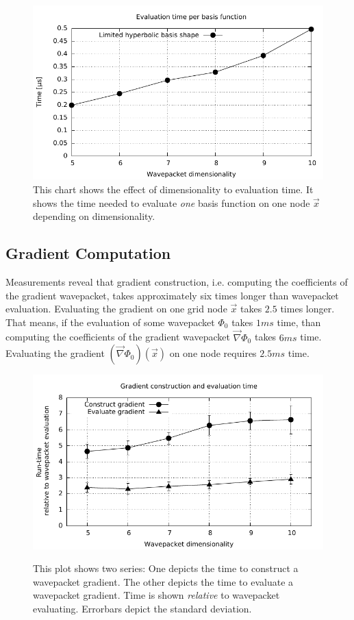\documentclass{article}
\begin{document}
\begin{figure}[H]
  \centering
  \includegraphics[width=1.0\textwidth]{plots/hawp_eval_efficiency}
  \caption{
    This chart shows the effect of dimensionality to evaluation time.
    It shows the time needed to evaluate \emph{one} basis function on one
    node \(\vec{x}\) depending on dimensionality.
  }
  \label{fig:hawp_eval_efficiency}
\end{figure}

\subsection{Gradient Computation}

Measurements reveal that gradient construction, i.e. computing the coefficients
of the gradient wavepacket, takes approximately six times longer than wavepacket evaluation.
Evaluating the gradient on one grid node \(\vec{x}\) takes \(2.5\) times longer.
That means, if the evaluation of some wavepacket \(\Phi_0\) takes \(1 ms\) time, than
computing the coefficients of the gradient wavepacket \(\vec{\nabla}\Phi_0\) takes \(6ms\) time.
Evaluating the gradient \((\vec{\nabla} \Phi_0)(\vec{x})\) on one node requires \(2.5 ms\) time.

\begin{figure}[H]
  \centering
  \includegraphics[width=1.0\textwidth]{plots/grad_reltime}
  \label{fig:grad_reltime}
  \caption{
    This plot shows two series: One depicts the time to construct a wavepacket gradient.
    The other depicts the time to evaluate a wavepacket gradient.
    Time is shown \emph{relative} to wavepacket evaluating.
    Errorbars depict the standard deviation.
  }
\end{figure}
\end{document}
